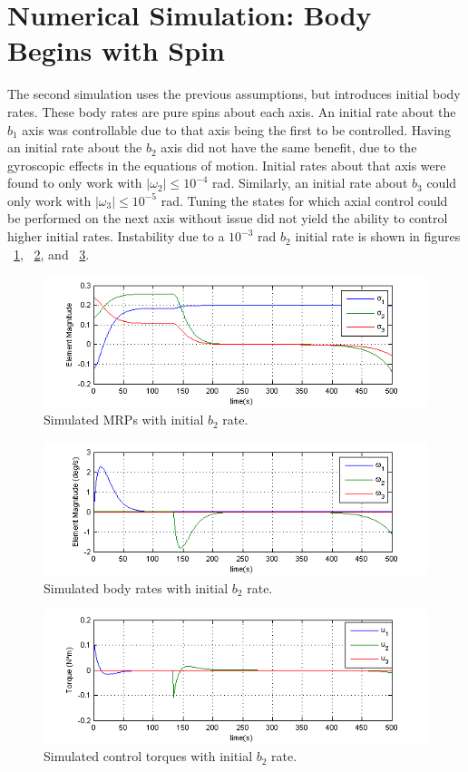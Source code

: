 \documentclass[paper]{aiaaNew}
\begin{document}
\section{Numerical Simulation: Body Begins with Spin}
The second simulation uses the previous assumptions, but introduces initial body rates. These body rates are pure spins about each axis. An initial rate about the $b_1$ axis was controllable due to that axis being the first to be controlled.  Having an initial rate about the $b_2$ axis did not have the same benefit, due to the gyroscopic effects in the equations of motion. Initial rates about that axis were found to only work with $\left | \omega_2 \right | \leq 10^{-4}$ rad.  Similarly, an initial rate about $b_3$ could only work with $\left | \omega_3 \right | \leq 10^{-5}$ rad.  Tuning the states for which axial control could be performed on the next axis without issue did not yield the ability to control higher initial rates. Instability due to a $10^{-3} $ rad $b_2$ initial rate is shown in figures ~\ref{fig:InitRatesMRP},  ~\ref{fig:InitRatesRates}, and  ~\ref{fig:InitRatesU}.
 \begin{figure}[htb]
 	\centering
 	\includegraphics[]{Figures/InitRatesMRP}
 	\caption{Simulated MRPs with initial $b_2$ rate.}
 	\label{fig:InitRatesMRP}
 \end{figure}
 \begin{figure}[htb]
 	\centering
 	\includegraphics[]{Figures/InitRatesRates}
 	\caption{Simulated body rates with initial $b_2$ rate.}
 	\label{fig:InitRatesRates}
 \end{figure}
 \begin{figure}[htb]
 	\centering
 	\includegraphics[]{Figures/InitRatesU}
 	\caption{Simulated control torques with initial $b_2$ rate.}
 	\label{fig:InitRatesU}
 \end{figure}
\par
\end{document}
